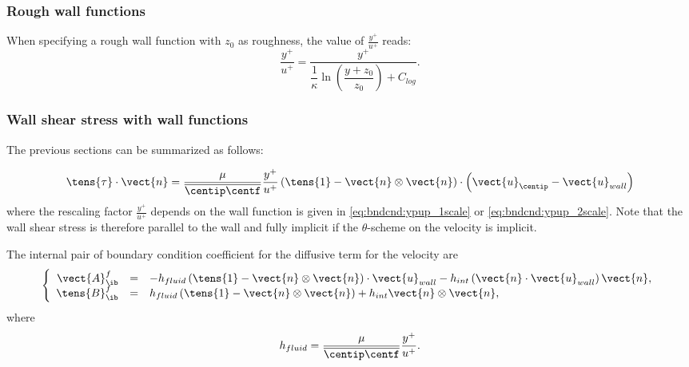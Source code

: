 \subsubsection{Rough wall functions}\label{sec:bndcnd:2velocityscales}
When specifying a rough wall function with $z_0$ as roughness, the value of $\frac{y^+}{u^+}$ reads:
\begin{equation}\label{eq:bndcnd:ypup_rough}
\dfrac{y^+}{u^+} = \dfrac{y^+}{ \dfrac{1}{\kappa} \ln \left( \dfrac{y+z_0}{z_0}\right) + C_{log}}.
\end{equation}



\subsubsection{Wall shear stress with wall functions}
The previous sections can be summarized as follows:

\begin{equation}
\tens{\tau} \cdot \vect{n} = \dfrac{\mu}{\overline{\centip \centf} } \dfrac{y^+}{u^+} \left(\tens{1} - \vect{n} \otimes \vect{n} \right) \cdot \left(\vect{u}_\centip - \vect{u}_{wall} \right)
\end{equation}
%
where the rescaling factor $\frac{y^+}{u^+}$ depends on the wall function is given in \eqref{eq:bndcnd:ypup_1scale} or \eqref{eq:bndcnd:ypup_2scale}. Note that the wall shear stress is therefore parallel to the wall and fully implicit if the $\theta$-scheme on the velocity is implicit.

The internal pair of boundary condition coefficient for the diffusive term for the velocity are
\begin{equation}\label{eq:bndcnd:boundary_condition_wall_function}
\left\lbrace
\begin{array}{r c l}
\vect{A}^f_\ib & = & -h_{fluid}  \left(\tens{1} - \vect{n} \otimes \vect{n} \right) \cdot  \vect{u}_{wall}
 - h_{int} \left( \vect{n} \cdot \vect{u}_{wall}  \right) \vect{n}
, \\
\tens{B}^f_\ib & = & h_{fluid}  \left(\tens{1} - \vect{n} \otimes \vect{n} \right)
+ h_{int} \vect{n} \otimes \vect{n}
,
\end{array}
\right.
\end{equation}
where
\begin{equation}
h_{fluid} = \dfrac{\mu}{\overline{\centip \centf} } \dfrac{y^+}{u^+}.
\end{equation}

